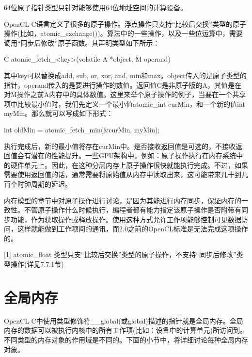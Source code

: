 64位原子指针类型只针对能够使用64位地址空间的计算设备。

OpenCL C语言定义了很多的原子操作。浮点操作只支持“比较后交换”类型的原子操作(比如，atomic\_\allowbreak{}exchange())。算法中的一些操作，以及一些位运算中，需要调用“同步后修改”原子函数。其声明类型如下所示：

\begin{codebox}[cpp]
C atomic_fetch_<key>(volatile A *object, M operand)
\end{codebox}

其中key可以替换成add, sub, or, xor, and, min和max。object传入的是原子类型的指针，operand传入的是要进行操作的数值。返回值C是非原子版的A，其值是在对M操作之前A内存中的具体数值。这里来举个原子操作的例子，当要在一个共享项中比较最小值时，我们先定义一个最小值atomic\_\allowbreak{}int curMin，和一个新的值int myMin。那么就可以写成如下形式：

\begin{codebox}[cpp]
int oldMin = atomic_fetch_min(&curMin, myMin);
\end{codebox}

执行完成后，新的最小值将存在curMin中。是否接收返回值是可选的，不接收返回值会有潜在的性能提升。一些GPU架构中，例如：原子操作执行在内存系统中的硬件单元上。因此，在这种分层内存上原子操作很快就能执行完成。不过，如果需要使用返回值的话，通常需要将原始值从内存中读取出来，这可能带来几十到几百个时钟周期的延迟。

内存模型的章节中对原子操作进行讨论，是因为其能进行内存同步，保证内存的一致性。不管原子操作什么时候执行，编程者都有能力指定该原子操作是否附带有同步功能，作为获取操作或释放操作。使用这种方式允许工作项能够控制可见数据访问，这样就能做到工作项间的通讯，而2.0之前的OpenCL标准是无法完成这项操作的。

\myRefRule

\begin{myRefs}

[1] atomic\_\allowbreak{}float 类型只支“比较后交换”类型的原子操作，不支持“同步后修改”类型操作(详见7.7.1节)

\end{myRefs}



\section{全局内存}

OpenCL C中使用类型修饰符\_\allowbreak{}\_\allowbreak{}global(或global)描述的指针就是全局内存。全局内存的数据可以被执行内核中的所有工作项(比如：设备中的计算单元)所访问到。不同类型的内存对象的作用域是不同的。下面的小节中，将详细讨论每种全局内存对象。

